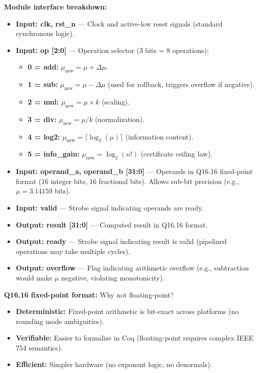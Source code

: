 \textbf{Module interface breakdown:}
\begin{itemize}
    \item \textbf{Input: clk, rst\_n} — Clock and active-low reset signals (standard synchronous logic).
    
    \item \textbf{Input: op [2:0]} — Operation selector (3 bits = 8 operations):
    \begin{itemize}
        \item \textbf{0 = add:} $\mu_{\text{new}} = \mu + \Delta\mu$.
        \item \textbf{1 = sub:} $\mu_{\text{new}} = \mu - \Delta\mu$ (used for rollback, triggers overflow if negative).
        \item \textbf{2 = mul:} $\mu_{\text{new}} = \mu \times k$ (scaling).
        \item \textbf{3 = div:} $\mu_{\text{new}} = \mu / k$ (normalization).
        \item \textbf{4 = log2:} $\mu_{\text{new}} = \lceil \log_2(\mu) \rceil$ (information content).
        \item \textbf{5 = info\_gain:} $\mu_{\text{new}} = \log_2(n!)$ (certificate ceiling law).
    \end{itemize}
    
    \item \textbf{Input: operand\_a, operand\_b [31:0]} — Operands in Q16.16 fixed-point format (16 integer bits, 16 fractional bits). Allows sub-bit precision (e.g., $\mu = 3.14159$ bits).
    
    \item \textbf{Input: valid} — Strobe signal indicating operands are ready.
    
    \item \textbf{Output: result [31:0]} — Computed result in Q16.16 format.
    
    \item \textbf{Output: ready} — Strobe signal indicating result is valid (pipelined operations may take multiple cycles).
    
    \item \textbf{Output: overflow} — Flag indicating arithmetic overflow (e.g., subtraction would make $\mu$ negative, violating monotonicity).
\end{itemize}

\textbf{Q16.16 fixed-point format:} Why not floating-point?
\begin{itemize}
    \item \textbf{Deterministic:} Fixed-point arithmetic is bit-exact across platforms (no rounding mode ambiguities).
    \item \textbf{Verifiable:} Easier to formalize in Coq (floating-point requires complex IEEE 754 semantics).
    \item \textbf{Efficient:} Simpler hardware (no exponent logic, no denormals).
\end{itemize}

